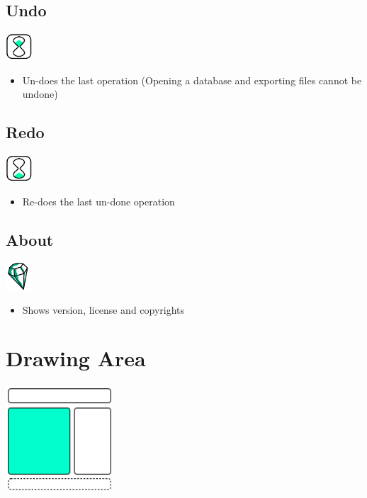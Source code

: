\subsection{Undo}

\includegraphics[width=1cm]{../../gui/source/resources/edit_undo.pdf}
\begin{itemize}
\item Un-does the last operation (Opening a database and exporting files cannot be undone)
\end{itemize}

\subsection{Redo}

\includegraphics[width=1cm]{../../gui/source/resources/edit_redo.pdf}
\begin{itemize}
\item Re-does the last un-done operation
\end{itemize}

\subsection{About}

\includegraphics[width=1cm]{../../gui/source/resources/crystal_facet_uml.pdf}
\begin{itemize}
\item Shows version, license and copyrights
\end{itemize}

\section{Drawing Area}

\includegraphics[width=4cm]{main_window_sketch_2.png}

